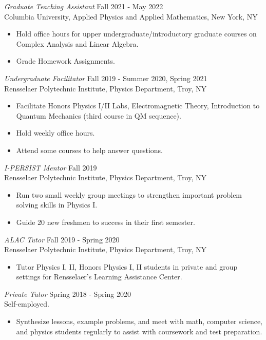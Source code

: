 \documentclass[margin]{rpires}
\begin{document}
\begin{resume}
    {\sl Graduate Teaching Assistant} \hfill Fall 2021 - May 2022 \\
    Columbia University, Applied Physics and Applied Mathematics, New York, NY
    \begin{itemize}  \itemsep -2pt %
        \item Hold office hours for upper undergraduate/introductory graduate courses on Complex Analysis and Linear Algebra.
        \item Grade Homework Assignments. 
    \end{itemize}    


    {\sl Undergraduate Facilitator} \hfill Fall 2019 - Summer 2020, Spring 2021 \\
    Rensselaer Polytechnic Institute, Physics Department, Troy, NY
    \begin{itemize}  \itemsep -2pt %
        \item Facilitate Honors Physics I/II Labs, Electromagnetic Theory, Introduction to Quantum Mechanics (third course in QM sequence).
        \item Hold weekly office hours.
        \item Attend some courses to help answer questions.
    \end{itemize}

    {\sl I-PERSIST Mentor} \hfill Fall 2019 \\
    Rensselaer Polytechnic Institute, Physics Department, Troy, NY
    \begin{itemize}  \itemsep -2pt %
        \item Run two small weekly group meetings to strengthen important problem solving skills in Physics I.
        \item Guide 20 new freshmen to success in their first semester.
    \end{itemize}

    {\sl ALAC Tutor} \hfill Fall 2019 - Spring 2020 \\
    Rensselaer Polytechnic Institute, Physics Department, Troy, NY
    \begin{itemize}  \itemsep -2pt %
        \item Tutor Physics I, II, Honors Physics I, II students in private and group settings for Rensselaer's Learning Assistance Center.
    \end{itemize}

    {\sl Private Tutor} \hfill Spring 2018 - Spring 2020 \\
    Self-employed.
    \begin{itemize}  \itemsep -2pt %
        \item Synthesize lessons, example problems, and meet with math, computer science, and physics students regularly to assist with coursework and test preparation.
    \end{itemize}
    

\end{resume}
\end{document}
